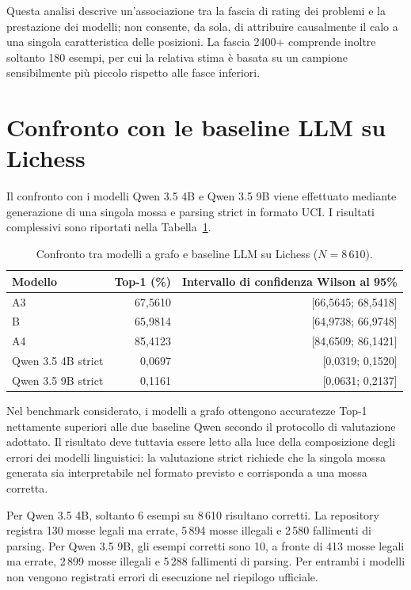 Questa analisi descrive un'associazione tra la fascia di rating dei problemi e la prestazione dei modelli; non consente, da sola, di attribuire causalmente il calo a una singola caratteristica delle posizioni. La fascia 2400+ comprende inoltre soltanto 180 esempi, per cui la relativa stima è basata su un campione sensibilmente più piccolo rispetto alle fasce inferiori.

\section{Confronto con le baseline LLM su Lichess}

Il confronto con i modelli Qwen 3.5 4B e Qwen 3.5 9B viene effettuato mediante generazione di una singola mossa e parsing strict in formato UCI. I risultati complessivi sono riportati nella Tabella~\ref{tab:llm-lichess-results}.

\begin{table}[htbp]
    \centering
    \small
    \caption{Confronto tra modelli a grafo e baseline LLM su Lichess (\(N=8\,610\)).}
    \label{tab:llm-lichess-results}
    \begin{tabular}{lrr}
        \toprule
        Modello & Top-1 (\%) & Intervallo di confidenza Wilson al 95\% \\
        \midrule
        A3 & 67,5610 & [66,5645; 68,5418] \\
        B & 65,9814 & [64,9738; 66,9748] \\
        A4 & 85,4123 & [84,6509; 86,1421] \\
        Qwen 3.5 4B strict & 0,0697 & [0,0319; 0,1520] \\
        Qwen 3.5 9B strict & 0,1161 & [0,0631; 0,2137] \\
        \bottomrule
    \end{tabular}
\end{table}

Nel benchmark considerato, i modelli a grafo ottengono accuratezze Top-1 nettamente superiori alle due baseline Qwen secondo il protocollo di valutazione adottato. Il risultato deve tuttavia essere letto alla luce della composizione degli errori dei modelli linguistici: la valutazione strict richiede che la singola mossa generata sia interpretabile nel formato previsto e corrisponda a una mossa corretta.

Per Qwen 3.5 4B, soltanto 6 esempi su 8\,610 risultano corretti. La repository registra 130 mosse legali ma errate, 5\,894 mosse illegali e 2\,580 fallimenti di parsing. Per Qwen 3.5 9B, gli esempi corretti sono 10, a fronte di 413 mosse legali ma errate, 2\,899 mosse illegali e 5\,288 fallimenti di parsing. Per entrambi i modelli non vengono registrati errori di esecuzione nel riepilogo ufficiale.

